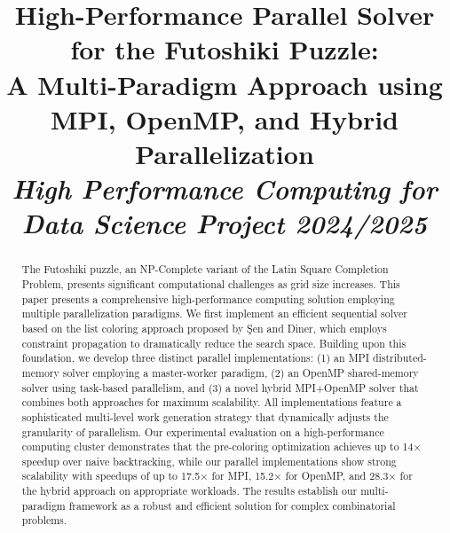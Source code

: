 \documentclass[10pt, conference]{IEEEtran}
\begin{document}


\title{High-Performance Parallel Solver for the Futoshiki Puzzle:\\
A Multi-Paradigm Approach using MPI, OpenMP, and Hybrid Parallelization\\
\normalsize \textit{High Performance Computing for Data Science Project 2024/2025}
}

\author{
\and
{}
\and
{}
}

\maketitle

\begin{abstract}
The Futoshiki puzzle, an NP-Complete variant of the Latin Square Completion Problem, presents significant computational challenges as grid size increases. This paper presents a comprehensive high-performance computing solution employing multiple parallelization paradigms. We first implement an efficient sequential solver based on the list coloring approach proposed by Şen and Diner, which employs constraint propagation to dramatically reduce the search space. Building upon this foundation, we develop three distinct parallel implementations: (1) an MPI distributed-memory solver employing a master-worker paradigm, (2) an OpenMP shared-memory solver using task-based parallelism, and (3) a novel hybrid MPI+OpenMP solver that combines both approaches for maximum scalability. All implementations feature a sophisticated multi-level work generation strategy that dynamically adjusts the granularity of parallelism. Our experimental evaluation on a high-performance computing cluster demonstrates that the pre-coloring optimization achieves up to 14× speedup over naive backtracking, while our parallel implementations show strong scalability with speedups of up to 17.5× for MPI, 15.2× for OpenMP, and 28.3× for the hybrid approach on appropriate workloads. The results establish our multi-paradigm framework as a robust and efficient solution for complex combinatorial problems.
\end{abstract}
\end{document}
